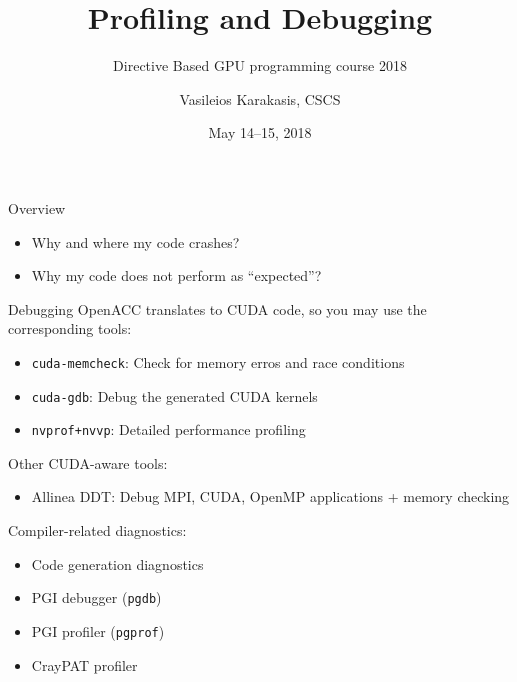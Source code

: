 \documentclass[aspectratio=169,12pt]{beamer}
\author{Vasileios Karakasis, CSCS}
\title{Profiling and Debugging}
\subtitle{Directive Based GPU programming course 2018}
\date{May 14--15, 2018}
\begin{document}
\cscstitle

\begin{frame}{Overview}
  \large
  \begin{itemize}
  \item Why and where my code crashes?
    \vspace\baselineskip
  \item Why my code does not perform as ``expected''?
  \end{itemize}
\end{frame}

\begin{frame}{Debugging}
  OpenACC translates to CUDA code, so you may use the corresponding tools:
  \begin{itemize}
  \item \texttt{cuda-memcheck}: Check for memory erros and race conditions
  \item \texttt{cuda-gdb}: Debug the generated CUDA kernels
  \item \texttt{nvprof+nvvp}: Detailed performance profiling
  \end{itemize}

  Other CUDA-aware tools:
  \begin{itemize}
  \item Allinea DDT: Debug MPI, CUDA, OpenMP applications + memory checking
  \end{itemize}

  Compiler-related diagnostics:
  \begin{itemize}
  \item Code generation diagnostics
  \item PGI debugger (\texttt{pgdb})
  \item PGI profiler (\texttt{pgprof})
  \item CrayPAT profiler
  \end{itemize}

\end{frame}
\end{document}
